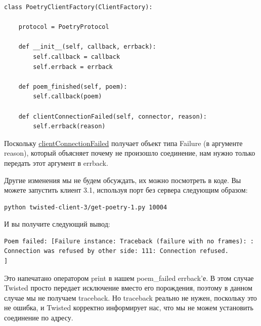 \begin{scriptsize}\begin{verbatim}
class PoetryClientFactory(ClientFactory):

    protocol = PoetryProtocol

    def __init__(self, callback, errback):
        self.callback = callback
        self.errback = errback

    def poem_finished(self, poem):
        self.callback(poem)

    def clientConnectionFailed(self, connector, reason):
        self.errback(reason)
\end{verbatim}\end{scriptsize}


Поскольку 
\href{http://twistedmatrix.com/trac/browser/tags/releases/twisted-8.2.0/twisted/internet/protocol.py#L118}{clientConnectionFailed} 
получает объект типа Failure (в аргументе reason), 
который объясняет почему не произошло соединение, нам нужно 
только передать этот аргумент в errback. 


Другие изменения мы не будем обсуждать, их можно посмотреть в коде. 
Вы можете запустить клиент 3.1, используя порт без сервера 
следующим образом:

\begin{scriptsize}\begin{verbatim}
python twisted-client-3/get-poetry-1.py 10004
\end{verbatim}\end{scriptsize}


И вы получите следующий вывод:

\begin{scriptsize}\begin{verbatim}
Poem failed: [Failure instance: Traceback (failure with no frames): : Connection was refused by other side: 111: Connection refused.
]
\end{verbatim}\end{scriptsize}


Это напечатано оператором print в нашем poem\_failed 
errback'е. В этом случае Twisted просто передает 
исключение вместо его порождения, поэтому в данном 
случае мы не получаем traceback. Но traceback реально не 
нужен, поскольку это не ошибка, и Twisted корректно информирует 
нас, что мы не можем установить соединение по адресу.


